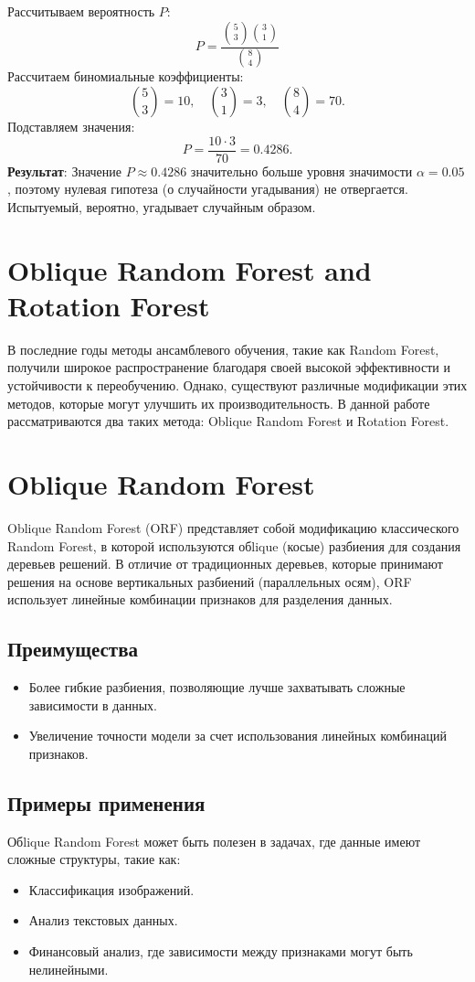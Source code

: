 Рассчитываем вероятность $P$:
\[
P = \frac{\binom{5}{3} \binom{3}{1}}{\binom{8}{4}}
\]
Рассчитаем биномиальные коэффициенты:
\[
\binom{5}{3} = 10, \quad \binom{3}{1} = 3, \quad \binom{8}{4} = 70.
\]
Подставляем значения:
\[
P = \frac{10 \cdot 3}{70} = 0.4286.
\]
\textbf{Результат}: Значение $P \approx 0.4286$ значительно больше уровня значимости $\alpha = 0.05$, поэтому нулевая гипотеза (о случайности угадывания) не отвергается. Испытуемый, вероятно, угадывает случайным образом.

\section{Oblique Random Forest and Rotation Forest}
В последние годы методы ансамблевого обучения, такие как Random Forest, получили широкое распространение благодаря своей высокой эффективности и устойчивости к переобучению. Однако, существуют различные модификации этих методов, которые могут улучшить их производительность. В данной работе рассматриваются два таких метода: Oblique Random Forest и Rotation Forest.

\section{Oblique Random Forest}
Oblique Random Forest (ORF) представляет собой модификацию классического Random Forest, в которой используются обlique (косые) разбиения для создания деревьев решений. В отличие от традиционных деревьев, которые принимают решения на основе вертикальных разбиений (параллельных осям), ORF использует линейные комбинации признаков для разделения данных.

\subsection{Преимущества}
\begin{itemize}
    \item Более гибкие разбиения, позволяющие лучше захватывать сложные зависимости в данных.
    \item Увеличение точности модели за счет использования линейных комбинаций признаков.
\end{itemize}

\subsection{Примеры применения}
Обlique Random Forest может быть полезен в задачах, где данные имеют сложные структуры, такие как:
\begin{itemize}
    \item Классификация изображений.
    \item Анализ текстовых данных.
    \item Финансовый анализ, где зависимости между признаками могут быть нелинейными.
\end{itemize}

